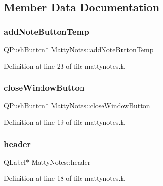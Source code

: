 \subsection{Member Data Documentation}
\hypertarget{classMattyNotes_a319952a9839f335ab9856b83369ea454}{}\label{classMattyNotes_a319952a9839f335ab9856b83369ea454} 
\subsubsection{\texorpdfstring{add\+Note\+Button\+Temp}{addNoteButtonTemp}}
{\footnotesize\ttfamily Q\+Push\+Button$\ast$ Matty\+Notes\+::add\+Note\+Button\+Temp}



Definition at line 23 of file mattynotes.\+h.

\hypertarget{classMattyNotes_ac72ba30ddc403561ed6904c4678caaaf}{}\label{classMattyNotes_ac72ba30ddc403561ed6904c4678caaaf} 
\subsubsection{\texorpdfstring{close\+Window\+Button}{closeWindowButton}}
{\footnotesize\ttfamily Q\+Push\+Button$\ast$ Matty\+Notes\+::close\+Window\+Button}



Definition at line 19 of file mattynotes.\+h.

\hypertarget{classMattyNotes_a855747a36f73f173f3d8f468c7196572}{}\label{classMattyNotes_a855747a36f73f173f3d8f468c7196572} 
\subsubsection{\texorpdfstring{header}{header}}
{\footnotesize\ttfamily Q\+Label$\ast$ Matty\+Notes\+::header}



Definition at line 18 of file mattynotes.\+h.

\hypertarget{classMattyNotes_a9c2352149386cb95946e3a8526c1ad2c}{}\label{classMattyNotes_a9c2352149386cb95946e3a8526c1ad2c} 
